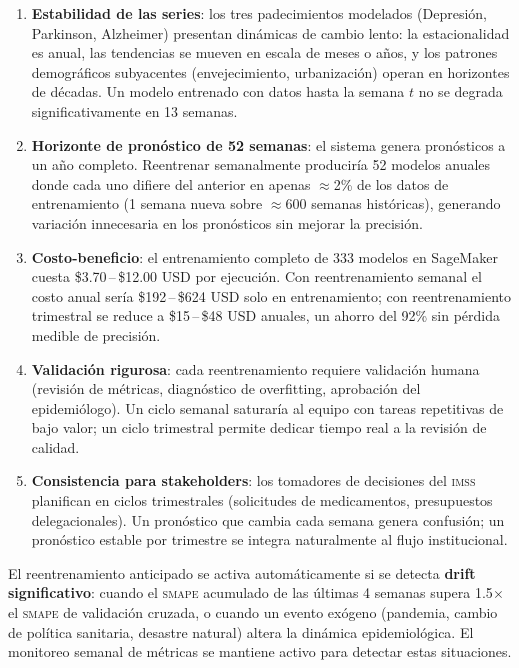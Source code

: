 \documentclass[12pt, letterpaper]{article}
\newcommand{\smape}{\textnormal{\textsc{smape}}}
\newcommand{\imss}{\textnormal{\textsc{imss}}}
\begin{document}
\begin{enumerate}[noitemsep]
    \item \textbf{Estabilidad de las series}: los tres padecimientos modelados (Depresión, Parkinson, Alzheimer) presentan dinámicas de cambio lento: la estacionalidad es anual, las tendencias se mueven en escala de meses o años, y los patrones demográficos subyacentes (envejecimiento, urbanización) operan en horizontes de décadas. Un modelo entrenado con datos hasta la semana $t$ no se degrada significativamente en 13 semanas.
    \item \textbf{Horizonte de pronóstico de 52 semanas}: el sistema genera pronósticos a un año completo. Reentrenar semanalmente produciría 52 modelos anuales donde cada uno difiere del anterior en apenas $\approx$2\% de los datos de entrenamiento (1 semana nueva sobre $\approx$600 semanas históricas), generando variación innecesaria en los pronósticos sin mejorar la precisión.
    \item \textbf{Costo-beneficio}: el entrenamiento completo de 333 modelos en SageMaker cuesta \$3.70\,--\,\$12.00 USD por ejecución. Con reentrenamiento semanal el costo anual sería \$192\,--\,\$624 USD solo en entrenamiento; con reentrenamiento trimestral se reduce a \$15\,--\,\$48 USD anuales, un ahorro del 92\% sin pérdida medible de precisión.
    \item \textbf{Validación rigurosa}: cada reentrenamiento requiere validación humana (revisión de métricas, diagnóstico de overfitting, aprobación del epidemiólogo). Un ciclo semanal saturaría al equipo con tareas repetitivas de bajo valor; un ciclo trimestral permite dedicar tiempo real a la revisión de calidad.
    \item \textbf{Consistencia para stakeholders}: los tomadores de decisiones del {\imss} planifican en ciclos trimestrales (solicitudes de medicamentos, presupuestos delegacionales). Un pronóstico que cambia cada semana genera confusión; un pronóstico estable por trimestre se integra naturalmente al flujo institucional.
\end{enumerate}

\begin{warningbox}
El reentrenamiento anticipado se activa automáticamente si se detecta \textbf{drift significativo}: cuando el \smape{} acumulado de las últimas 4 semanas supera 1.5$\times$ el \smape{} de validación cruzada, o cuando un evento exógeno (pandemia, cambio de política sanitaria, desastre natural) altera la dinámica epidemiológica. El monitoreo semanal de métricas se mantiene activo para detectar estas situaciones.
\end{warningbox}
\end{document}

